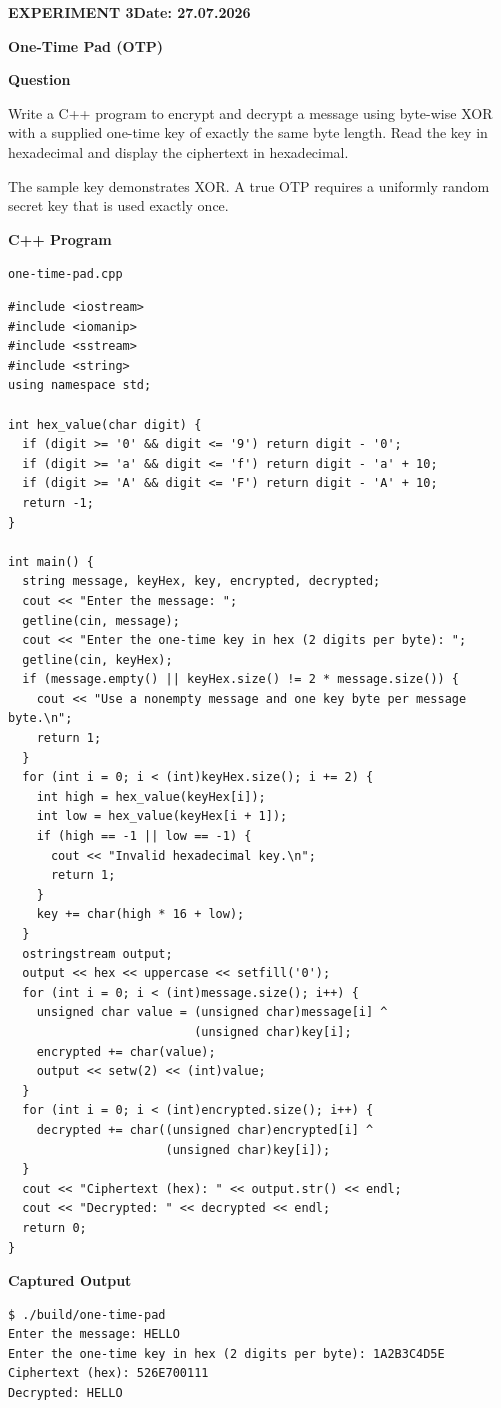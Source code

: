 \documentclass[11pt,a4paper]{article}
\newcommand{\blocktitle}[1]{\Needspace{6\baselineskip}\par\textbf{#1}\par}
\begin{document}
\clearpage
{}\label{exp:one-time-pad}
{\small\bfseries EXPERIMENT 3\hfill Date: 27.07.2026\par}
{\Large\bfseries One-Time Pad (OTP)\par}
\vspace{2mm}
\blocktitle{Question}
Write a C++ program to encrypt and decrypt a message using byte-wise XOR with a supplied one-time key of exactly the same byte length. Read the key in hexadecimal and display the ciphertext in hexadecimal.

The sample key demonstrates XOR. A true OTP requires a uniformly random secret key that is used exactly once.

\blocktitle{C++ Program}
{\small\texttt{one-time-pad.cpp}\par}
\begin{lstlisting}[style=cpp]
#include <iostream>
#include <iomanip>
#include <sstream>
#include <string>
using namespace std;

int hex_value(char digit) {
  if (digit >= '0' && digit <= '9') return digit - '0';
  if (digit >= 'a' && digit <= 'f') return digit - 'a' + 10;
  if (digit >= 'A' && digit <= 'F') return digit - 'A' + 10;
  return -1;
}

int main() {
  string message, keyHex, key, encrypted, decrypted;
  cout << "Enter the message: ";
  getline(cin, message);
  cout << "Enter the one-time key in hex (2 digits per byte): ";
  getline(cin, keyHex);
  if (message.empty() || keyHex.size() != 2 * message.size()) {
    cout << "Use a nonempty message and one key byte per message byte.\n";
    return 1;
  }
  for (int i = 0; i < (int)keyHex.size(); i += 2) {
    int high = hex_value(keyHex[i]);
    int low = hex_value(keyHex[i + 1]);
    if (high == -1 || low == -1) {
      cout << "Invalid hexadecimal key.\n";
      return 1;
    }
    key += char(high * 16 + low);
  }
  ostringstream output;
  output << hex << uppercase << setfill('0');
  for (int i = 0; i < (int)message.size(); i++) {
    unsigned char value = (unsigned char)message[i] ^
                          (unsigned char)key[i];
    encrypted += char(value);
    output << setw(2) << (int)value;
  }
  for (int i = 0; i < (int)encrypted.size(); i++) {
    decrypted += char((unsigned char)encrypted[i] ^
                      (unsigned char)key[i]);
  }
  cout << "Ciphertext (hex): " << output.str() << endl;
  cout << "Decrypted: " << decrypted << endl;
  return 0;
}
\end{lstlisting}
\par\begin{minipage}{\linewidth}
\textbf{Captured Output}\par
\begin{lstlisting}[style=terminal]
$ ./build/one-time-pad
Enter the message: HELLO
Enter the one-time key in hex (2 digits per byte): 1A2B3C4D5E
Ciphertext (hex): 526E700111
Decrypted: HELLO
\end{lstlisting}
\end{minipage}
\end{document}
